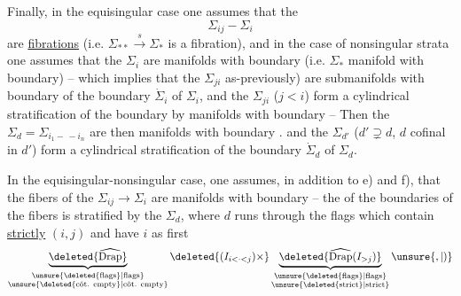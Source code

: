 Finally, in the equisingular case one assumes that the
\[
\Sigma_{ij}-\Sigma_i
\]
are \uline{fibrations} (i.e. $\Sigma_{**}\xrightarrow{s}\Sigma_*$ is a fibration), and in the case of nonsingular strata one assumes that the $\Sigma_i$ are manifolds with boundary (i.e. $\Sigma_*$ manifold with boundary) -- which implies that the $\Sigma_{ji}$  as-previously) are submanifolds with boundary of the  boundary $\dot\Sigma_i$ of $\Sigma_i$, and the $\Sigma_{ji}$ ($j<i$) form  a cylindrical stratification \margin{$*$}of the \deleted{$\unsure{\Sigma_*}$} boundary by manifolds with boundary -- Then the $\Sigma_d=\Sigma_{i_1-\, -i_n}$ are then manifolds with boundary . and the $\Sigma_{d'}$ ($d'\supsetneq d$, $d$ cofinal in $d'$)  form a cylindrical stratification of the boundary  $\dot\Sigma_d$ of $\Sigma_d$.

In the equisingular-nonsingular case, one assumes, in addition to e) and f), that the fibers of the  $\Sigma_{ij}\longrightarrow\Sigma_i$ are manifolds with boundary -- the   of the boundaries of the fibers is  stratified by the $\Sigma_d$, where $d$  runs through the flags which contain \uline{strictly} \deleted{$\unsure{\Sigma}$} $(i,j)$ and have $i$ as first
\[
\underbrace{\deleted{\widehat{\operatorname{Drap}}}}_{\substack{\text{\unsure{\deleted{flags}|flags}}\\\text{\unsure{\deleted{côt. empty}|côt. empty}}}}\deleted{(I_{i<\cdot<j})\times}
\underbrace{\deleted{\widehat{\operatorname{Drap}}(I_{>j})}}_{\substack{\text{\unsure{\deleted{flags}|flags}}\\\text{\unsure{\deleted{strict}|strict}}}}\unsure{,|)}
\]
